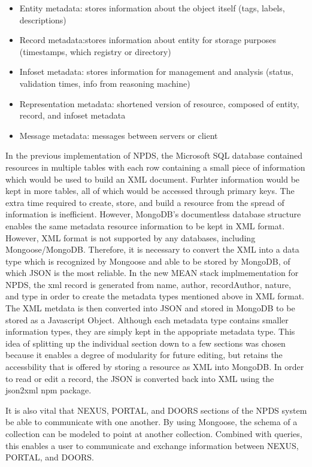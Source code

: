 \documentclass[10pt,twocolumn,twoside]{article}
\begin{document}
\begin{itemize}
  \item Entity metadata: stores information about the object itself (tags, labels, descriptions)
  \item Record metadata:stores information about entity for storage purposes (timestamps, which registry or directory)
  \item Infoset metadata: stores information for management and analysis (status, validation times, info from reasoning machine)
  \item Representation metadata: shortened version of resource, composed of entity, record, and infoset metadata
  \item Message metadata: messages between servers or client
\end{itemize}
	In the previous implementation of NPDS, the Microsoft SQL database contained resources in multiple tables with each row containing a small piece of information which would be used to build an XML document. Furhter information would be kept in more tables, all of which would be accessed through primary keys. The extra time required to create, store, and build a resource from the spread of information is inefficient. However, MongoDB's documentless database structure enables the same metadata resource information to be kept in XML format. However, XML format is not supported by any databases, including Mongoose/MongoDB. Therefore, it is necessary to convert the XML into a data type which is recognized by Mongoose and able to be stored by MongoDB, of which JSON is the most reliable. In the new MEAN stack implmementation for NPDS, the xml record is generated from name, author, recordAuthor, nature, and type in order to create the metadata types mentioned above in XML format. The XML metdata is then converted into JSON and stored in MongoDB to be stored as a Javascript Object. Although each metadata type contains smaller information types, they are simply kept in the appopriate metadata type. This idea of splitting up the individual section down to a few sections was chosen because it enables a degree of modularity for future editing, but retains the accessbility that is offered by storing a resource as XML into MongoDB. In order to read or edit a record, the JSON is converted back into XML using the json2xml npm package. 

	It is also vital that NEXUS, PORTAL, and DOORS sections of the NPDS system be able to communicate with one another. By using Mongoose, the schema of a collection can be modeled to point at another collection. Combined with queries, this enables a user to communicate and exchange information between NEXUS, PORTAL, and DOORS.  \newline
\end{document}
